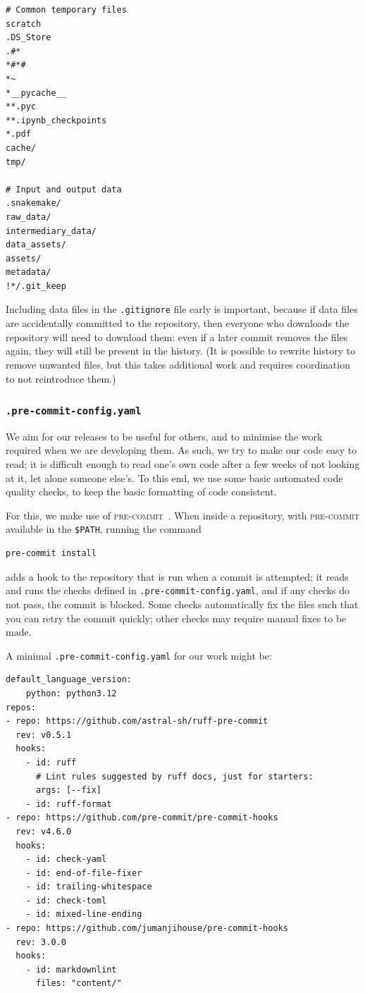 \documentclass{article}
\newcommand\filename[1]{\texttt{#1}\xspace}
\newcommand\program[1]{\textsc{#1}\xspace}
\begin{document}
\begin{verbatim}
# Common temporary files
scratch
.DS_Store
.#*
*#*#
*~
*__pycache__
**.pyc
**.ipynb_checkpoints
*.pdf
cache/
tmp/

# Input and output data
.snakemake/
raw_data/
intermediary_data/
data_assets/
assets/
metadata/
!*/.git_keep
\end{verbatim}

Including data files in the \filename{.gitignore} file early is important,
because if data files are accidentally committed to the repository,
then everyone who downloads the repository will need to download them:
even if a later commit removes the files again,
they will still be present in the history.
(It is possible to rewrite history to remove unwanted files,
but this takes additional work and requires coordination to not reintroduce them.)

\subsubsection{\filename{.pre-commit-config.yaml}}

We aim for our releases to be useful for others,
and to minimise the work required when we are developing them.
As such,
we try to make our code easy to read;
it is difficult enough to read one's own code
after a few weeks of not looking at it,
let alone someone else's.
To this end,
we use some basic automated code quality checks,
to keep the basic formatting of code consistent.

For this,
we make use of \program{pre-commit}~\cite{pre-commit}.
When inside a repository,
with \program{pre-commit} available in the \texttt{\$PATH},
running the command
\begin{verbatim}
pre-commit install
\end{verbatim}
adds a hook to the repository that is run when a commit is attempted;
it reads and runs the checks defined in \filename{.pre-commit-config.yaml},
and if any checks do not pass,
the commit is blocked.
Some checks automatically fix the files such that you can retry the commit quickly;
other checks may require manual fixes to be made.

A minimal \filename{.pre-commit-config.yaml} for our work might be:

\begin{verbatim}
default_language_version:
    python: python3.12
repos:
- repo: https://github.com/astral-sh/ruff-pre-commit
  rev: v0.5.1
  hooks:
    - id: ruff
      # Lint rules suggested by ruff docs, just for starters:
      args: [--fix]
    - id: ruff-format
- repo: https://github.com/pre-commit/pre-commit-hooks
  rev: v4.6.0
  hooks:
    - id: check-yaml
    - id: end-of-file-fixer
    - id: trailing-whitespace
    - id: check-toml
    - id: mixed-line-ending
- repo: https://github.com/jumanjihouse/pre-commit-hooks
  rev: 3.0.0
  hooks:
    - id: markdownlint
      files: "content/"
\end{verbatim}
\end{document}

